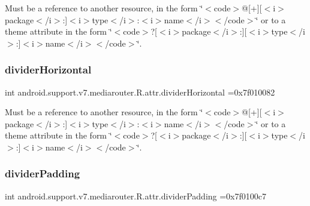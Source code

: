 Must be a reference to another resource, in the form \char`\"{}$<$code$>$@\mbox{[}+\mbox{]}\mbox{[}$<$i$>$package$<$/i$>$\+:\mbox{]}$<$i$>$type$<$/i$>$\+:$<$i$>$name$<$/i$>$$<$/code$>$\char`\"{} or to a theme attribute in the form \char`\"{}$<$code$>$?\mbox{[}$<$i$>$package$<$/i$>$\+:\mbox{]}\mbox{[}$<$i$>$type$<$/i$>$\+:\mbox{]}$<$i$>$name$<$/i$>$$<$/code$>$\char`\"{}. \mbox{\label{classandroid_1_1support_1_1v7_1_1mediarouter_1_1R_1_1attr_ab722068c962f9a2b375b02825173ff58}} 
\subsubsection{\texorpdfstring{divider\+Horizontal}{dividerHorizontal}}
{\footnotesize\ttfamily int android.\+support.\+v7.\+mediarouter.\+R.\+attr.\+divider\+Horizontal =0x7f010082\hspace{0.3cm}{\ttfamily [static]}}

Must be a reference to another resource, in the form \char`\"{}$<$code$>$@\mbox{[}+\mbox{]}\mbox{[}$<$i$>$package$<$/i$>$\+:\mbox{]}$<$i$>$type$<$/i$>$\+:$<$i$>$name$<$/i$>$$<$/code$>$\char`\"{} or to a theme attribute in the form \char`\"{}$<$code$>$?\mbox{[}$<$i$>$package$<$/i$>$\+:\mbox{]}\mbox{[}$<$i$>$type$<$/i$>$\+:\mbox{]}$<$i$>$name$<$/i$>$$<$/code$>$\char`\"{}. \mbox{\label{classandroid_1_1support_1_1v7_1_1mediarouter_1_1R_1_1attr_a1211ba7f3739936f900811426f3f70d9}} 
\subsubsection{\texorpdfstring{divider\+Padding}{dividerPadding}}
{\footnotesize\ttfamily int android.\+support.\+v7.\+mediarouter.\+R.\+attr.\+divider\+Padding =0x7f0100c7\hspace{0.3cm}{\ttfamily [static]}}

